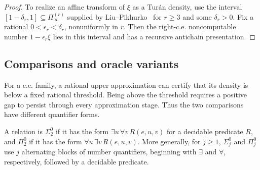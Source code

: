 \documentclass[10pt]{article}
\numberwithin{equation}{section}
\theoremstyle{definition}
\begin{document}
\begin{proof}
To realize an affine transform of $\xi$ as a Tur\'an density, use the interval $[1-\delta_r,1]\subseteq\Pi_\infty^{(r)}$ supplied by Liu--Pikhurko~\cite[Theorem 1.1]{LiuPikhurkoIntervals2026} for $r\ge3$ and some $\delta_r>0$. Fix a rational $0<\epsilon_r<\delta_r$, nonuniformly in $r$. Then the right-c.e. noncomputable number $1-\epsilon_r\xi$ lies in this interval and has a recursive antichain presentation.
\end{proof}

\subsection{Comparisons and oracle variants}
For a c.e. family, a rational upper approximation can certify that its density is below a fixed rational threshold. Being above the threshold requires a positive gap to persist through every approximation stage. Thus the two comparisons have different quantifier forms.

A relation is \emph{$\Sigma^0_2$} if it has the form $\exists u\,\forall v\,R(e,u,v)$ for a decidable predicate $R$, and \emph{$\Pi^0_2$} if it has the form $\forall u\,\exists v\,R(e,u,v)$. More generally, for $j\ge1$, $\Sigma^0_j$ and $\Pi^0_j$ use $j$ alternating blocks of number quantifiers, beginning with $\exists$ and $\forall$, respectively, followed by a decidable predicate.
\end{document}
